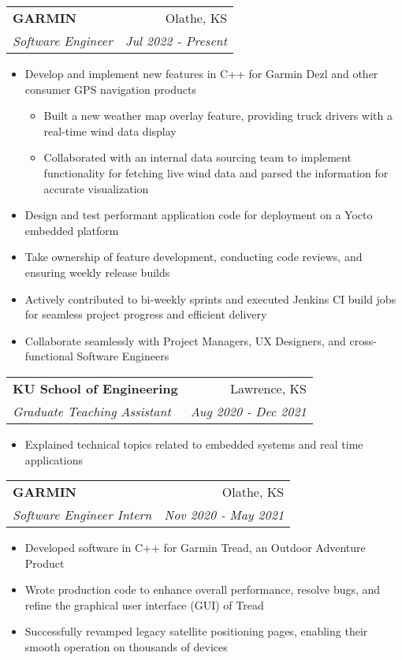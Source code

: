 \documentclass[letterpaper,10pt]{article}
\makeatletter
\newcommand{\resumeItem}[2]{
  \item\normalsize{
    {#1}{#2 \vspace{-2pt}}
  }
}
\newcommand{\resumeSubheading}[4]{
  \vspace{-1pt}\item[]
  \begin{tabular*}{0.98\textwidth}{l@{\extracolsep{\fill}}r}
      \hspace{-10pt}\textbf{#1} & #2 \\
      \hspace{-10pt}\textit{\normalsize#3} & \textit{\normalsize #4} \\
    \end{tabular*}\vspace{-3pt}
}
\newcommand{\resumeItemListStart}{\begin{itemize}}
\newcommand{\resumeItemListEnd}{\end{itemize}\vspace{-5pt}}
\makeatother
\begin{document}
{    %
\resumeSubheading
{GARMIN}{Olathe, KS}
{Software Engineer}{Jul 2022 - Present}
\resumeItemListStart
\resumeItem{}
{Develop and implement new features in C++ for Garmin Dezl and other consumer GPS navigation products
\begin{itemize}
  \item Built a new weather map overlay feature, providing truck drivers with a real-time wind data display
  \item Collaborated with an internal data sourcing team to implement functionality for fetching live wind data and parsed the information for accurate visualization
\end{itemize}}
\resumeItem{}
{Design and test performant application code for deployment on a Yocto embedded platform}
\resumeItem{}
{Take ownership of feature development, conducting code reviews, and ensuring weekly release builds}
\resumeItem{}
{Actively contributed to bi-weekly sprints and executed Jenkins CI build jobs for seamless project progress and efficient delivery}
\resumeItem{}
{Collaborate seamlessly with Project Managers, UX Designers, and cross-functional Software Engineers}
\resumeItemListEnd



    \vspace{6pt}
   
    \resumeSubheading
    {KU School of Engineering}{Lawrence, KS}
    {Graduate Teaching Assistant}{Aug 2020 - Dec 2021}
      \resumeItemListStart
      \resumeItem{}
        {Explained technical topics related to embedded systems and real time applications}
    \resumeItemListEnd

    \vspace{6pt}

    \resumeSubheading
    {GARMIN}{Olathe, KS}
    {Software Engineer Intern}{Nov 2020 - May 2021}
      \resumeItemListStart
      \resumeItem{}
        {Developed software in C++ for Garmin Tread, an Outdoor Adventure Product}
      \resumeItem{}
        {Wrote production code to enhance overall performance, resolve bugs, and refine the graphical user interface (GUI) of Tread}
      \resumeItem{}
        {Successfully revamped legacy satellite positioning pages, enabling their smooth operation on thousands of devices}
    \resumeItemListEnd
      
}
\end{document}
